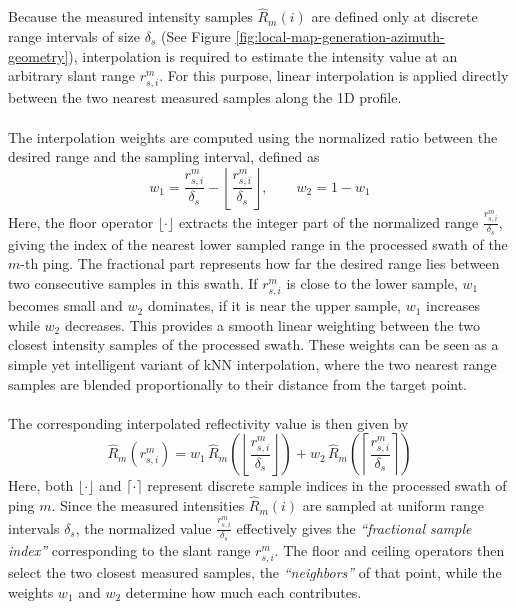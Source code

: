 \\ \\
Because the measured intensity samples $\hat{R}_m(i)$ are defined only at discrete range intervals of size $\delta_s$ (See Figure \ref{fig:local-map-generation-azimuth-geometry}), interpolation is required to estimate the intensity value at an arbitrary slant range $r_{s,i}^m$. For this purpose, linear interpolation is applied directly between the two nearest measured samples along the 1D profile.  
\\ \\
The interpolation weights are computed using the normalized ratio between the desired range and the sampling interval, defined as
$$
    w_1 = \frac{r_{s,i}^m}{\delta_s} - 
          \left\lfloor \frac{r_{s,i}^m}{\delta_s} \right\rfloor, 
    \qquad
    w_2 = 1 - w_1
$$
Here, the floor operator $\lfloor \cdot \rfloor$ extracts the integer part of the normalized range $\frac{r_{s,i}^m}{\delta_s}$, giving the index of the nearest lower sampled range in the processed swath of the $m$-th ping. The fractional part represents how far the desired range lies between two consecutive samples in this swath. If $r_{s,i}^m$ is close to the lower sample, $w_1$ becomes small and $w_2$ dominates, if it is near the upper sample, $w_1$ increases while $w_2$ decreases. This provides a smooth linear weighting between the two closest intensity samples of the processed swath. These weights can be seen as a simple yet intelligent variant of kNN interpolation, where the two nearest range samples are blended proportionally to their distance from the target point.
\\ \\
The corresponding interpolated reflectivity value is then given by
$$
    \hat{R}_m(r_{s,i}^m) =
    w_1 \, \hat{R}_m\!\left(
        \left\lfloor \frac{r_{s,i}^m}{\delta_s} \right\rfloor
    \right)
    + 
    w_2 \, \hat{R}_m\!\left(
        \left\lceil \frac{r_{s,i}^m}{\delta_s} \right\rceil
    \right)
$$
Here, both $\lfloor \cdot \rfloor$ and $\lceil \cdot \rceil$ represent discrete sample indices in the processed swath of ping $m$. Since the measured intensities $\hat{R}_m(i)$ are sampled at uniform range intervals $\delta_s$, the normalized value $\frac{r_{s,i}^m}{\delta_s}$ effectively gives the \textit{``fractional sample index''} corresponding to the slant range $r_{s,i}^m$. The floor and ceiling operators then select the two closest measured samples, the \textit{``neighbors''} of that point, while the weights $w_1$ and $w_2$ determine how much each contributes.  
